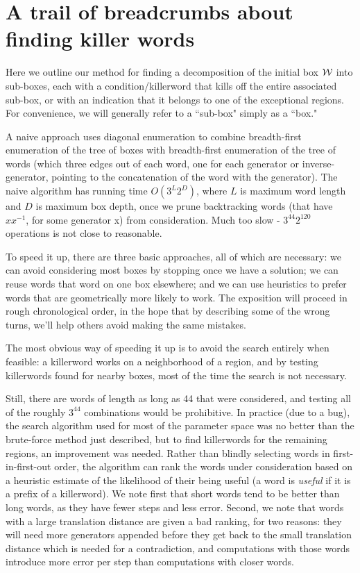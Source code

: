 \section{A trail of breadcrumbs about finding killer words}

Here we outline our method for finding a decomposition of
the initial box ${\cal W}$ into sub-boxes,
each with a condition/killerword that kills off the entire associated sub-box,
or with an indication that it belongs to one of the exceptional regions.
For convenience, we will generally refer to a ``sub-box" simply as a ``box."

A naive approach uses diagonal enumeration
to combine breadth-first enumeration of the tree of boxes
with breadth-first enumeration of the tree of words
(which three edges out of each word, one for each generator or inverse-generator,
pointing to the concatenation of the word with the generator).
The naive algorithm has running time $O(3^L 2^D)$, where $L$ is maximum word length
and $D$ is maximum box depth,
once we prune backtracking words (that have $x x^{-1}$, for some generator x) from consideration.
Much too slow - $3^44 2^120$ operations is not close to reasonable.

To speed it up, there are three basic approaches, all of which are necessary:
we can avoid considering most boxes by stopping once we have a solution;
we can reuse words that word on one box elsewhere;
and we can use heuristics to prefer words that are geometrically more likely to work.
The exposition will proceed in rough chronological order,
in the hope that by describing some of the wrong turns,
we'll help others avoid making the same mistakes.

The most obvious way of speeding it up is to avoid
the search entirely when feasible: a killerword works on a neighborhood of a
region, and by testing killerwords found for nearby boxes, most of
the time the search is not necessary.

Still, there are words of length as long as 44 that were considered,
and testing all of the roughly $3^{44}$ combinations would be prohibitive.
In practice (due to a bug), the search algorithm used for most of the parameter
space was no better than the brute-force method just described,
but to find killerwords for the remaining regions, an improvement was needed.
Rather than blindly selecting words in first-in-first-out order,
the algorithm can rank the words under consideration
based on a heuristic estimate of the likelihood of their being useful
(a word is {\it useful} if it is a prefix of a killerword).
We note first that short words tend to be better than long words,
as they have fewer steps and less error.
Second, we note that words
with a large translation distance are given a bad ranking, for two reasons:
they will need more generators appended before they get back to the
small translation distance which is needed for a contradiction, and
computations with those words introduce more error per step than
computations with closer words.


